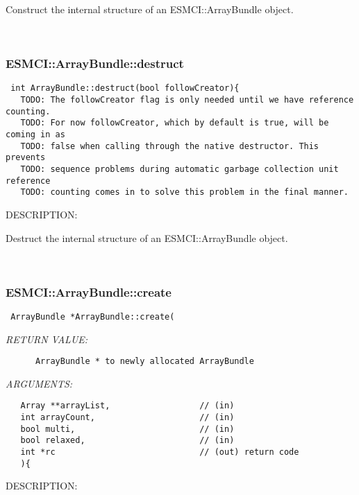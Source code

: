       Construct the internal structure of an ESMCI::ArrayBundle object.
   
 
\mbox{}\hrulefill\
 
\subsubsection [ESMCI::ArrayBundle::destruct] {ESMCI::ArrayBundle::destruct}


  
\begin{verbatim} int ArrayBundle::destruct(bool followCreator){
   TODO: The followCreator flag is only needed until we have reference counting.
   TODO: For now followCreator, which by default is true, will be coming in as
   TODO: false when calling through the native destructor. This prevents
   TODO: sequence problems during automatic garbage collection unit reference
   TODO: counting comes in to solve this problem in the final manner.\end{verbatim}
{\sf DESCRIPTION:\\ }


      Destruct the internal structure of an ESMCI::ArrayBundle object.
   
 
\mbox{}\hrulefill\
 
\subsubsection [ESMCI::ArrayBundle::create] {ESMCI::ArrayBundle::create}


  
\begin{verbatim} ArrayBundle *ArrayBundle::create(\end{verbatim}{\em RETURN VALUE:}
\begin{verbatim}      ArrayBundle * to newly allocated ArrayBundle\end{verbatim}{\em ARGUMENTS:}
\begin{verbatim}   Array **arrayList,                  // (in)
   int arrayCount,                     // (in)
   bool multi,                         // (in)
   bool relaxed,                       // (in)
   int *rc                             // (out) return code
   ){\end{verbatim}
{\sf DESCRIPTION:\\ }


